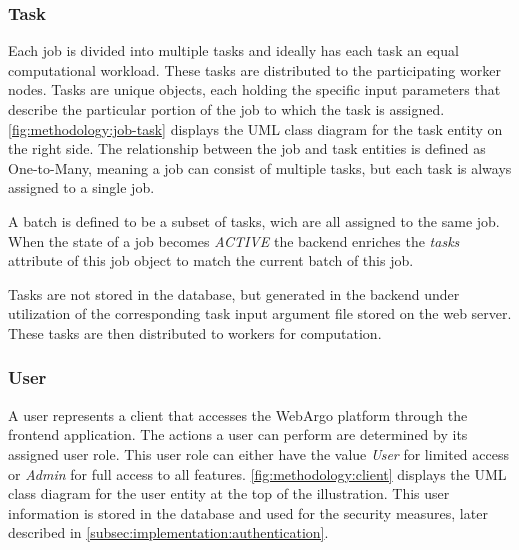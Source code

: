 \subsubsection{Task}
Each job is divided into multiple tasks and ideally has each task an equal computational workload. These tasks are distributed to the participating worker nodes. Tasks are unique objects, each holding the specific input parameters that describe the particular portion of the job to which the task is assigned. \autoref{fig:methodology:job-task} displays the \ac{UML} class diagram for the task entity on the right side. The relationship between the job and task entities is defined as One-to-Many, meaning a job can consist of multiple tasks, but each task is always assigned to a single job.

A batch is defined to be a subset of tasks, wich are all assigned to the same job. When the state of a job becomes \emph{ACTIVE} the backend enriches the \emph{tasks} attribute of this job object to match the current batch of this job.

Tasks are not stored in the database, but generated in the backend under utilization of the corresponding task input argument file stored on the web server. These tasks are then distributed to workers for computation.

\subsubsection{User}
A user represents a client that accesses the WebArgo platform through the frontend application. The actions a user can perform are determined by its assigned user role. This user role can either have the value \emph{User} for limited access or \emph{Admin} for full access to all features. \autoref{fig:methodology:client} displays the \ac{UML} class diagram for the user entity at the top of the illustration. This user information is stored in the database and used for the security measures, later described in \autoref{subsec:implementation:authentication}. 


